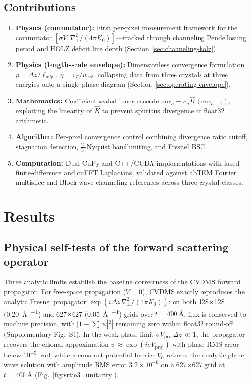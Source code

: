 \documentclass[twoside,11pt]{article}
\begin{document}
\subsection{Contributions}
\begin{enumerate}
\item \textbf{Physics (commutator):} First per-pixel measurement framework for the commutator $[\sigma V,\nabla_\perp^2/(4\pi K_0)]$---tracked through channeling Pendell\"osung period and HOLZ deficit line depth (Section~\ref{sec:channeling-holz}).
\item \textbf{Physics (length-scale envelope):} Dimensionless convergence formulation $\rho=\Delta z/\ell_\text{mfp}$, $\eta=r_F/w_\text{col}$, collapsing data from three crystals at three energies onto a single-phase diagram (Section~\ref{sec:operating-envelope}).
\item \textbf{Mathematics:} Coefficient-scaled inner cascade $\text{cur}_n=c_n\hat{K}(\text{cur}_{n-1})$, exploiting the linearity of $\hat{K}$ to prevent spurious divergence in float32 arithmetic.
\item \textbf{Algorithm:} Per-pixel convergence control combining divergence ratio cutoff, stagnation detection, $\tfrac23$-Nyquist bandlimiting, and Fresnel BSC.
\item \textbf{Computation:} Dual CuPy and C++/CUDA implementations with fused finite-difference and cuFFT Laplacians, validated against abTEM Fourier multislice and Bloch-wave channeling references across three crystal classes.
\end{enumerate}

\section{Results}

\subsection{Physical self-tests of the forward scattering operator}\label{sec:self-tests}

Three analytic limits establish the baseline correctness of the CVDMS forward propagator. For free-space propagation ($V=0$), CVDMS exactly reproduces the analytic Fresnel propagator $\exp(i\Delta z\,\nabla_\perp^2/(4\pi K_0))$: on both 128$\times$128 (\SI{0.20}{\angstrom\per\pixel}) and 627$\times$627 (\SI{0.05}{\angstrom\per\pixel}) grids over $t=\SI{400}{\angstrom}$, flux is conserved to machine precision, with $|1-\sum|\psi|^2|$ remaining zero within float32 round-off (Supplementary Fig.~S1). In the weak-phase limit $\sigma V_\text{proj}\Delta z\ll1$, the propagator recovers the eikonal approximation $\psi\approx\exp(i\sigma V_\text{proj})$ with phase RMS error below $10^{-5}$~rad, while a constant potential barrier $V_0$ returns the analytic plane-wave solution with amplitude RMS error $3.2\times10^{-6}$ on a 627$\times$627 grid at $t=\SI{400}{\angstrom}$ (Fig.~\ref{fig:srtio3_unitarity}).
\end{document}
